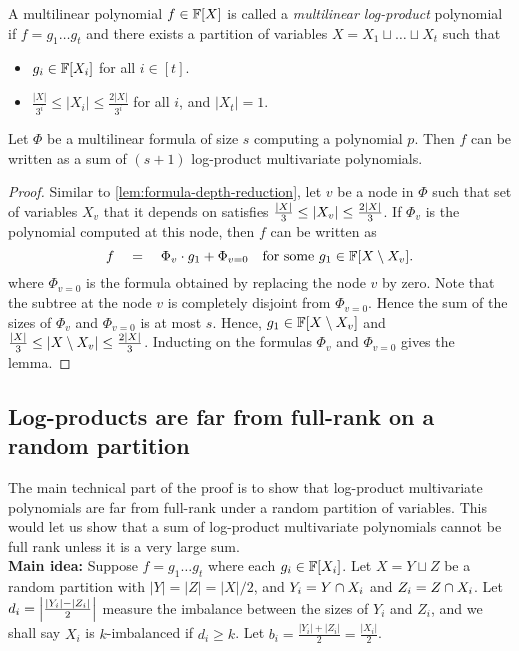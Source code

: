 \begin{definition}\label{defn:mult-logproduct}
  A multilinear polynomial $f\in \mathbb{F}[X]$ is called a \emph{multilinear log-product} polynomial if $f = g_1\dots g_t$ and there exists a partition of variables $X = X_1 \sqcup \dots \sqcup X_t$ such that
  \begin{itemize}
  \item $g_i \in \mathbb{F}[X_i]$ for all $i \in [t]$.
  \item $\frac{|X|}{3^i} \leq |X_i| \leq \frac{2|X|}{3^i}$ for all
    $i$, and $|X_t| = 1$.
  \end{itemize}
\end{definition}

\begin{lemma}\label{lem:mult-logproduct}
  Let $\Phi$ be a multilinear formula of size $s$ computing a polynomial $p$. 
Then $f$ can be written as a sum of $(s+1)$ log-product multivariate polynomials.
\end{lemma}
\begin{proof}
  Similar to \autoref{lem:formula-depth-reduction}, let $v$ be a node in $\Phi$ such that set of variables $X_v$ that it depends on satisfies $\frac{|X|}{3} \leq \left|X_v\right| \leq \frac{2|X|}{3}$. 
If $\Phi_v$ is the polynomial computed at this node, then $f$ can be written as
  $$
  f \quad = \quad \Phi_v \cdot g_1 + \Phi_{v=0} \quad\text{for some $g_1 \in \mathbb{F}[X\setminus X_v]$}.
  $$
  where $\Phi_{v=0}$ is the formula obtained by replacing the node $v$ by zero. 
Note that the subtree at the node $v$ is completely disjoint from $\Phi_{v=0}$. 
Hence the sum of the sizes of $\Phi_v$ and $\Phi_{v=0}$ is at most $s$. 
Hence, $g_1 \in \mathbb{F}[X\setminus X_v]$ and $\frac{|X|}{3} \leq \left|X \setminus X_v\right| \leq \frac{2|X|}{3}$. 
Inducting on the formulas $\Phi_v$ and $\Phi_{v=0}$ gives the lemma.
\end{proof}

\subsection{Log-products are far from full-rank on a random
  partition}

The main technical part of the proof is to show that log-product multivariate polynomials are far from full-rank under a random partition of variables. 
This would let us show that a sum of log-product multivariate polynomials cannot be full rank unless it is a very large sum.\\

{\bf Main idea: } Suppose $f = g_1 \dots g_t$ where each $g_i \in \mathbb{F}[X_i]$. 
Let $X = Y \sqcup Z$ be a random partition with $|Y| = |Z| = |X|/2$, and $Y_i = Y \cap X_i$ and $Z_i = Z \cap X_i$. 
Let $d_i = \left|\frac{|Y_i| - |Z_i|}{2}\right|$ measure the imbalance between the sizes of $Y_i$ and $Z_i$, and we shall say $X_i$ is $k$-imbalanced if $d_i \geq k$. 
Let $b_i = \frac{|Y_i| + |Z_i|}{2} = \frac{|X_i|}{2}$.

